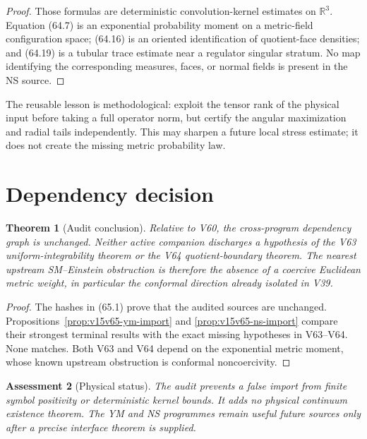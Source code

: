 \documentclass[11pt]{article}
\newtheorem{theorem}{Theorem}[section]
\newtheorem{assessment}[theorem]{Assessment}
\theoremstyle{remark}
\begin{document}
\begin{proof}
Those formulas are deterministic convolution-kernel estimates on
\(\mathbb R^3\).  Equation (64.7) is an exponential probability
moment on a metric-field configuration space; (64.16) is an
oriented identification of quotient-face densities; and (64.19)
is a tubular trace estimate near a regulator singular stratum.
No map identifying the corresponding measures, faces, or normal
fields is present in the NS source.
\end{proof}

The reusable lesson is methodological: exploit the tensor rank of
the physical input before taking a full operator norm, but certify
the angular maximization and radial tails independently.  This may
sharpen a future local stress estimate; it does not create the
missing metric probability law.

\section{Dependency decision}

\begin{theorem}[Audit conclusion]
\label{thm:v15v65-conclusion}
Relative to V60, the cross-program dependency graph is unchanged.
Neither active companion discharges a hypothesis of the V63
uniform-integrability theorem or the V64 quotient-boundary theorem.
The nearest upstream SM--Einstein obstruction is therefore the
absence of a coercive Euclidean metric weight, in particular the
conformal direction already isolated in V39.
\end{theorem}

\begin{proof}
The hashes in (65.1) prove that the audited sources are unchanged.
Propositions~\ref{prop:v15v65-ym-import} and
\ref{prop:v15v65-ns-import} compare their strongest terminal
results with the exact missing hypotheses in V63--V64.  None
matches.  Both V63 and V64 depend on the exponential metric moment,
whose known upstream obstruction is conformal noncoercivity.
\end{proof}

\begin{assessment}[Physical status]
\label{ass:v15v65-status}
The audit prevents a false import from finite symbol positivity or
deterministic kernel bounds.  It adds no physical continuum
existence theorem.  The YM and NS programmes remain useful future
sources only after a precise interface theorem is supplied.
\end{assessment}
\end{document}
